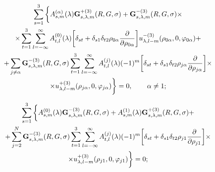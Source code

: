 \begin{russian}
\begin{multline}
\sum\limits_{s = 1}^3 \bigg\{  A_{s,m}^{(\alpha )}(\lambda ){\bf{G}}_{s,\lambda ,m}^{ + (3)}(R,G,\sigma ) + {\bf{G}}_{s,\lambda ,m}^{ - (3)}(R,G,\sigma ) \times \\
\times \sum\limits_{t = 1}^3 {\sum\limits_{l =  - \infty }^\infty  {A_{t,l}^{(0)}} } (\lambda )\bigg[{\delta _{st}} + {\delta _{s1}}{\delta _{t2}}{\rho _{0\alpha }}\frac{\partial }{{\partial {\rho _{0\alpha }}}}\bigg]u_{\lambda ,l - m}^{ - (3)}({\rho _{0\alpha }},0,{\varphi _{0\alpha }}) + \\
+ \sum\limits_{j \ne \alpha } {{\bf{G}}_{s,\lambda ,m}^{ - (3)}} (R,G,\sigma )\sum\limits_{t = 1}^3 {\sum\limits_{l =  - \infty }^\infty  {A_{t,l}^{(j)}} } (\lambda ){( - 1)^m}\bigg[{\delta _{st}} + {\delta _{s1}}{\delta _{t2}}{\rho _{j\alpha }}\frac{\partial }{{\partial {\rho _{j\alpha }}}}\bigg] \times \\
\times u_{\lambda ,l - m}^{ + (3)}({\rho _{j\alpha }},0,{\varphi _{j\alpha }})\bigg\}  = 0,\qquad {\kern 1pt} \alpha  \ne 1;
\label{eq:7:23}
\end{multline}

\begin{multline}
\sum\limits_{s = 1}^3 \bigg\{  A_{s,m}^{(0)}(\lambda ){\bf{G}}_{s,\lambda ,m}^{ - (3)}(R,G,\sigma ) + A_{s,m}^{(1)}(\lambda ){\bf{G}}_{s,\lambda ,m}^{ + (3)}(R,G,\sigma ) + \\
+ \mathop \sum \limits_{j = 2}^N {\bf{G}}_{s,\lambda ,m}^{ - (3)}(R,G,\sigma )\sum\limits_{t = 1}^3 {\sum\limits_{l =  - \infty }^\infty  {A_{t,l}^{(j)}} } (\lambda ){( - 1)^m}\bigg[{\delta _{st}} + {\delta _{s1}}{\delta _{t2}}{\rho _{j1}}\frac{\partial }{{\partial {\rho _{j1}}}}\bigg] \times \\
\times u_{\lambda ,l - m}^{ + (3)}({\rho _{j1}},0,{\varphi _{j1}})\bigg\}  = 0;
\label{eq:7:24}
\end{multline}


\end{russian}
